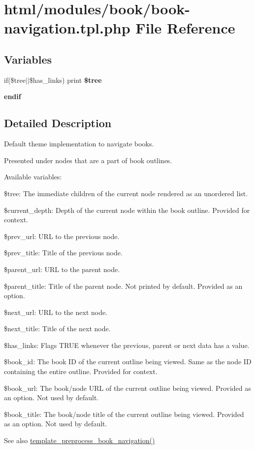 \hypertarget{book-navigation_8tpl_8php}{
\section{html/modules/book/book-\/navigation.tpl.php File Reference}
\label{book-navigation_8tpl_8php}
}
\subsection*{Variables}
\begin{DoxyCompactItemize}
\item 
\hypertarget{book-navigation_8tpl_8php_a250010eed3e0a7047a9141f8f7eb73b0}{
if(\$tree$|$$|$\$has\_\-links) print {\bfseries \$tree}}
\label{book-navigation_8tpl_8php_a250010eed3e0a7047a9141f8f7eb73b0}

\item 
\hypertarget{book-navigation_8tpl_8php_a82cd33ca97ff99f2fcc5e9c81d65251b}{
{\bfseries endif}}
\label{book-navigation_8tpl_8php_a82cd33ca97ff99f2fcc5e9c81d65251b}

\end{DoxyCompactItemize}


\subsection{Detailed Description}
Default theme implementation to navigate books.

Presented under nodes that are a part of book outlines.

Available variables:
\begin{DoxyItemize}
\item \$tree: The immediate children of the current node rendered as an unordered list.
\item \$current\_\-depth: Depth of the current node within the book outline. Provided for context.
\item \$prev\_\-url: URL to the previous node.
\item \$prev\_\-title: Title of the previous node.
\item \$parent\_\-url: URL to the parent node.
\item \$parent\_\-title: Title of the parent node. Not printed by default. Provided as an option.
\item \$next\_\-url: URL to the next node.
\item \$next\_\-title: Title of the next node.
\item \$has\_\-links: Flags TRUE whenever the previous, parent or next data has a value.
\item \$book\_\-id: The book ID of the current outline being viewed. Same as the node ID containing the entire outline. Provided for context.
\item \$book\_\-url: The book/node URL of the current outline being viewed. Provided as an option. Not used by default.
\item \$book\_\-title: The book/node title of the current outline being viewed. Provided as an option. Not used by default.
\end{DoxyItemize}

\begin{DoxySeeAlso}{See also}
\hyperlink{book_8module_aa5d42034a0e369d49bb21ae74409e9fa}{template\_\-preprocess\_\-book\_\-navigation()} 
\end{DoxySeeAlso}
